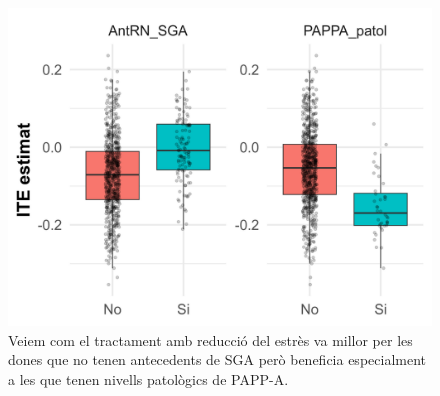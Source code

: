 \documentclass[../main.tex]{subfiles}
\begin{document}
\begin{figure}[!htb]
\begin{minipage}[t]{0.48\textwidth}
        \includegraphics[width=\textwidth]{imgs/boxplots/boxplot_3_SGA.jpg}
        \captionsetup{font=footnotesize}
        \caption{Veiem com el tractament amb reducció del estrès va millor per les dones que no tenen antecedents de SGA però beneficia especialment a les que tenen nivells patològics de PAPP-A.}
        \label{boxplot:SGA3}
      \end{minipage}
    \end{figure}
\end{document}

